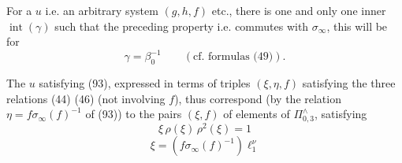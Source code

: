 For a $u$  \unsure{(}i.e. an arbitrary system $(g,h,f)$ etc., there is one and only one inner  $\operatorname{int}(\gamma)$ such that   the preceding property i.e. commutes with $\sigma_\infty$,  this will be for
\[
 \gamma=\beta_0^{-1}\qquad(\text{cf. formulas (49)}).
\]

The $u$ satisfying (93), expressed in terms of triples $(\xi,\eta,f)$ satisfying the three relations (44) (46) (not involving $f$),  thus correspond (by the relation $\eta=f\sigma_\infty(f)^{-1}$ of (93)) to the  pairs $(\xi,f)$ of elements of $\Pi_{0,3}^{\wedge}$, satisfying
\[
\tag{95}
 \xi\,\rho(\xi)\,\rho^2(\xi)=1
\]
\[
\tag{96}
 \xi=(f\sigma_\infty(f)^{-1})\ell_1^\nu
\]


